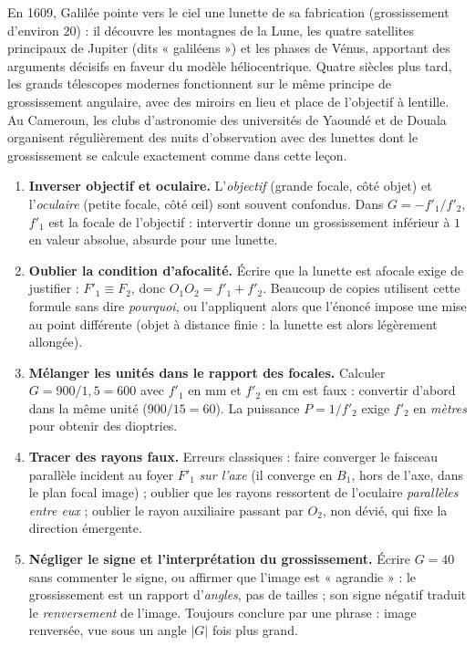 \documentclass[11pt]{article}
\begin{document}
\begin{savaistu}
En 1609, Galilée pointe vers le ciel une lunette de sa fabrication (grossissement d'environ $20$) : il découvre les montagnes de la Lune, les quatre satellites principaux de Jupiter (dits « galiléens ») et les phases de Vénus, apportant des arguments décisifs en faveur du modèle héliocentrique. Quatre siècles plus tard, les grands télescopes modernes fonctionnent sur le même principe de grossissement angulaire, avec des miroirs en lieu et place de l'objectif à lentille. Au Cameroun, les clubs d'astronomie des universités de Yaoundé et de Douala organisent régulièrement des nuits d'observation avec des lunettes dont le grossissement se calcule exactement comme dans cette leçon.
\end{savaistu}

\begin{attention}
\begin{enumerate}
\item \textbf{Inverser objectif et oculaire.} L'\emph{objectif} (grande focale, côté objet) et l'\emph{oculaire} (petite focale, côté œil) sont souvent confondus. Dans $G = -f'_1/f'_2$, $f'_1$ est la focale de l'objectif : intervertir donne un grossissement inférieur à $1$ en valeur absolue, absurde pour une lunette.
\item \textbf{Oublier la condition d'afocalité.} Écrire que la lunette est afocale exige de justifier : $F'_1 \equiv F_2$, donc $O_1O_2 = f'_1 + f'_2$. Beaucoup de copies utilisent cette formule sans dire \emph{pourquoi}, ou l'appliquent alors que l'énoncé impose une mise au point différente (objet à distance finie : la lunette est alors légèrement allongée).
\item \textbf{Mélanger les unités dans le rapport des focales.} Calculer $G = 900/1,5 = 600$ avec $f'_1$ en mm et $f'_2$ en cm est faux : convertir d'abord dans la même unité ($900/15 = 60$). La puissance $P = 1/f'_2$ exige $f'_2$ en \emph{mètres} pour obtenir des dioptries.
\item \textbf{Tracer des rayons faux.} Erreurs classiques : faire converger le faisceau parallèle incident au foyer $F'_1$ \emph{sur l'axe} (il converge en $B_1$, hors de l'axe, dans le plan focal image) ; oublier que les rayons ressortent de l'oculaire \emph{parallèles entre eux} ; oublier le rayon auxiliaire passant par $O_2$, non dévié, qui fixe la direction émergente.
\item \textbf{Négliger le signe et l'interprétation du grossissement.} Écrire $G = 40$ sans commenter le signe, ou affirmer que l'image est « agrandie » : le grossissement est un rapport d'\emph{angles}, pas de tailles ; son signe négatif traduit le \emph{renversement} de l'image. Toujours conclure par une phrase : image renversée, vue sous un angle $|G|$ fois plus grand.
\end{enumerate}
\end{attention}
\end{document}
